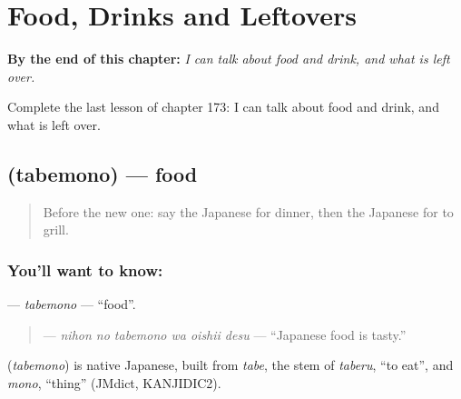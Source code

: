 
\chapter{Food, Drinks and Leftovers}
\label{ch:ja-food-drinks-and-leftovers}

\begin{chapteropening}
\textbf{By the end of this chapter:} \emph{I can talk about food and drink, and what is left over.}

Complete the last lesson of chapter 173: I can talk about food and drink, and what is left over.
\end{chapteropening}

\section[\texorpdfstring{\ja{たべもの} (tabemono)}{たべもの (tabemono)}]{ (tabemono) — food}

\label{lesson:JA-C173-tabemono}



\begin{quote}
Before the new one: say the Japanese for dinner, then the Japanese for to grill.
\end{quote}

\subsection*{You'll want to know: }
\textbf{} — \emph{tabemono} — \textquotedblleft{}food\textquotedblright{}.

\begin{quote}
\textbf{  } — \emph{nihon no tabemono wa oishii desu} — \textquotedblleft{}Japanese food is tasty.\textquotedblright{}
\end{quote}

\begin{cousinweb}
\textbf{} (\emph{tabemono}) is native Japanese, built from \emph{tabe}, the stem of \emph{taberu}, \textquotedblleft{}to eat\textquotedblright{}, and \emph{mono}, \textquotedblleft{}thing\textquotedblright{} (JMdict, KANJIDIC2).
\end{cousinweb}

